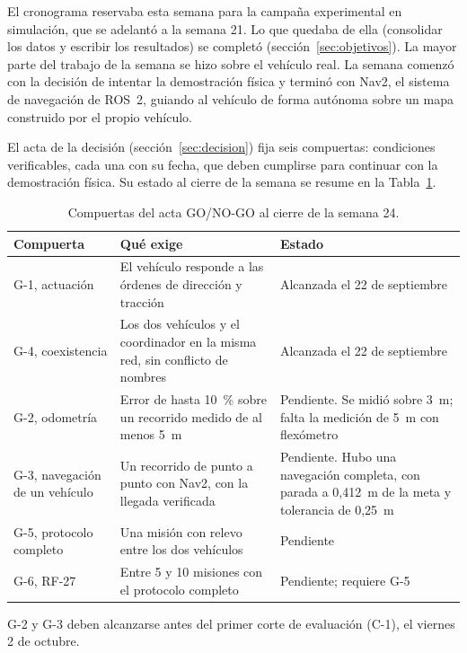 \documentclass[12pt,letterpaper]{article}
\begin{document}
El cronograma reservaba esta semana para la campaña experimental en simulación, que se adelantó a la semana 21. Lo que quedaba de ella (consolidar los datos y escribir los resultados) se completó (sección~\ref{sec:objetivos}). La mayor parte del trabajo de la semana se hizo sobre el vehículo real. La semana comenzó con la decisión de intentar la demostración física y terminó con Nav2, el sistema de navegación de ROS~2, guiando al vehículo de forma autónoma sobre un mapa construido por el propio vehículo.

El acta de la decisión (sección~\ref{sec:decision}) fija seis compuertas: condiciones verificables, cada una con su fecha, que deben cumplirse para continuar con la demostración física. Su estado al cierre de la semana se resume en la Tabla~\ref{tab:compuertas}.

\begin{table}[H]
    \centering
    \small
    \caption{Compuertas del acta GO/NO-GO al cierre de la semana 24.}
    \label{tab:compuertas}
    \begin{tabular}{@{}p{3.6cm}p{5.4cm}p{5.0cm}@{}}
        \toprule
        \textbf{Compuerta} & \textbf{Qué exige} & \textbf{Estado} \\ \midrule
        G-1, actuación & El vehículo responde a las órdenes de dirección y tracción & Alcanzada el 22 de septiembre \\ \addlinespace
        G-4, coexistencia & Los dos vehículos y el coordinador en la misma red, sin conflicto de nombres & Alcanzada el 22 de septiembre \\ \addlinespace
        G-2, odometría & Error de hasta 10~\% sobre un recorrido medido de al menos 5~m & Pendiente. Se midió sobre 3~m; falta la medición de 5~m con flexómetro \\ \addlinespace
        G-3, navegación de un vehículo & Un recorrido de punto a punto con Nav2, con la llegada verificada & Pendiente. Hubo una navegación completa, con parada a 0,412~m de la meta y tolerancia de 0,25~m \\ \addlinespace
        G-5, protocolo completo & Una misión con relevo entre los dos vehículos & Pendiente \\ \addlinespace
        G-6, RF-27 & Entre 5 y 10 misiones con el protocolo completo & Pendiente; requiere G-5 \\ \bottomrule
    \end{tabular}
\end{table}

G-2 y G-3 deben alcanzarse antes del primer corte de evaluación (C-1), el viernes 2 de octubre.
\end{document}

